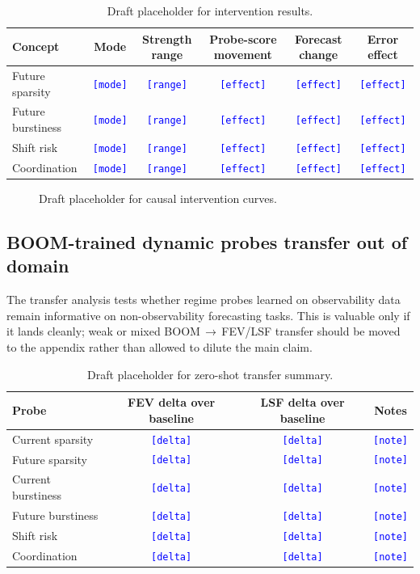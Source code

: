 \documentclass{article}
\newcommand{\tbd}[1]{\textcolor{blue}{\texttt{[#1]}}}
\newcommand{\boom}{\textsc{BOOM}}
\newcommand{\fev}{\textsc{FEV}}
\newcommand{\lsf}{\textsc{LSF}}
\begin{document}
\begin{table}[t]
\centering
\small
\begin{tabularx}{\textwidth}{lccccc}
\toprule
Concept & Mode & Strength range & Probe-score movement & Forecast change & Error effect \\
\midrule
Future sparsity & \tbd{mode} & \tbd{range} & \tbd{effect} & \tbd{effect} & \tbd{effect} \\
Future burstiness & \tbd{mode} & \tbd{range} & \tbd{effect} & \tbd{effect} & \tbd{effect} \\
Shift risk & \tbd{mode} & \tbd{range} & \tbd{effect} & \tbd{effect} & \tbd{effect} \\
Coordination & \tbd{mode} & \tbd{range} & \tbd{effect} & \tbd{effect} & \tbd{effect} \\
\bottomrule
\end{tabularx}
\caption{Draft placeholder for intervention results.}
\label{tab:interventions}
\end{table}

\begin{figure}[t]
\centering
{}
\caption{Draft placeholder for causal intervention curves.}
\label{fig:intervention}
\end{figure}

\subsection{\boom{}-trained dynamic probes transfer out of domain}

The transfer analysis tests whether regime probes learned on observability data remain informative on non-observability forecasting tasks. This is valuable only if it lands cleanly; weak or mixed \boom{}\,$\rightarrow$\,\fev{}/\lsf{} transfer should be moved to the appendix rather than allowed to dilute the main claim.

\begin{table}[t]
\centering
\small
\begin{tabularx}{\textwidth}{lccc}
\toprule
Probe & \fev{} delta over baseline & \lsf{} delta over baseline & Notes \\
\midrule
Current sparsity & \tbd{delta} & \tbd{delta} & \tbd{note} \\
Future sparsity & \tbd{delta} & \tbd{delta} & \tbd{note} \\
Current burstiness & \tbd{delta} & \tbd{delta} & \tbd{note} \\
Future burstiness & \tbd{delta} & \tbd{delta} & \tbd{note} \\
Shift risk & \tbd{delta} & \tbd{delta} & \tbd{note} \\
Coordination & \tbd{delta} & \tbd{delta} & \tbd{note} \\
\bottomrule
\end{tabularx}
\caption{Draft placeholder for zero-shot transfer summary.}
\label{tab:transfer}
\end{table}
\end{document}

